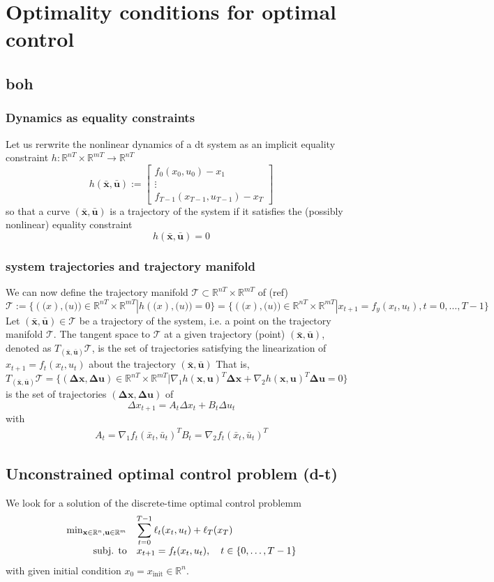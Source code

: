 \documentclass{book}
\newcommand{\R}{\mathbb{R}}
\newcommand{\traj}{(\bar{\mathbf{x}},\bar{\mathbf{u}})}
\theoremstyle{definition}
\theoremstyle{remark}
\theoremstyle{remark}
\begin{document}
\chapter{Optimality conditions for optimal control}
\section{boh}
\subsection{Dynamics as equality constraints}
Let us rerwrite the nonlinear dynamics of a dt system as an implicit equality constraint $h:\R^{nT}\times \R^{mT}\to\R^{nT}$ 
\[
    h\traj:=\begin{bmatrix}
        f_0(x_0,u_0)-x_1 \\ \vdots \\ f_{T-1}(x_{T-1},u_{T-1})-x_T
    \end{bmatrix}
\]
so that a curve $\traj$ is a trajectory of the system if it satisfies the (possibly nonlinear) equality constraint 
\[
    h\traj = 0
\]
\subsection{system trajectories and trajectory manifold}
We can now define the trajectory manifold $\mathcal{T}\subset \R^{nT}\times \R^{mT}$ of (ref) %
\[
    \mathcal{T} := \{(\mathbf(x),\mathbf(u))\in\R^{nT}\times\R^{mT}|h(\mathbf(x),\mathbf(u))=0\}=\{(\mathbf(x),\mathbf(u))\in\R^{nT}\times\R^{mT}|x_{t+1}=f_y(x_t,u_t),t=0,\dots,T-1\}
\]
Let $\traj\in\mathcal{T}$ be a trajectory of the system, i.e. a point on the trajectory manifold $\mathcal{T}$. The tangent space to $\mathcal{T}$ at a given trajectory (point) $\traj$, denoted as $T_\traj\mathcal{T}$, is the set of trajectories satisfying the linearization of $x_{t+1} = f_t(x_t,u_t)$ about the trajectory $\traj$
That is, $T_\traj\mathcal{T}=\{(\mathbf{\Delta x, \Delta u})\in\R^{nT}\times\R^{mT}|\nabla_1h(\mathbf{x},\mathbf{u})^T\mathbf{\Delta x} + \nabla_2h(\mathbf{x},\mathbf{u})^T\mathbf{\Delta u} = 0\}$ is the set of trajectories $(\mathbf{\Delta x, \Delta u})$ of
\[
    \Delta x_{t+1} = A_t\Delta x_t + B_t \Delta u_t
\]
with 
\begin{gather*}
    A_t = \nabla_1f_t(\bar{x}_t,\bar{u}_t)^T
    B_t = \nabla_2f_t(\bar{x}_t,\bar{u}_t)^T
\end{gather*}


\section{Unconstrained optimal control problem (d-t)}
We look for a solution of the discrete-time optimal control problemm 
\[
    \begin{array} {r l}
        \min_{\mathbf{x}\in\R^n,\mathbf{u}\in\R^m} & \displaystyle\sum_{t=0}^{T-1}\ell_t(x_t,u_t)+\ell_T(x_T)\\
        \text{subj. to} & x_{t+1} = f_t(x_t,u_t), \quad t\in\{0,\dots,T-1\} 
    \end{array}
\]
with given initial condition $x_0 = x_{\text{init}}\in \R^n$. 
\end{document}
